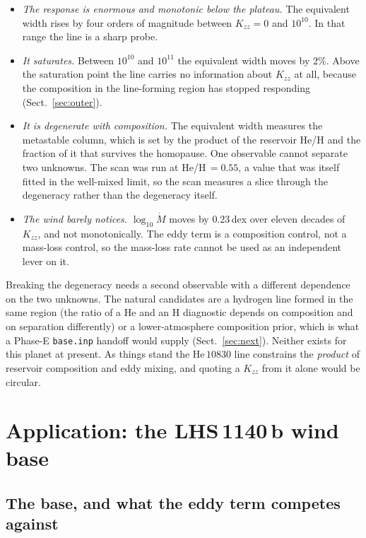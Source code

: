 \documentclass[english,a4paper]{my_memo}
\begin{document}
\begin{itemize}
\item \emph{The response is enormous and monotonic below the plateau.} The
      equivalent width rises by four orders of magnitude between
      $K_{zz} = 0$ and $10^{10}$. In that range the line is a sharp probe.
\item \emph{It saturates.} Between $10^{10}$ and $10^{11}$ the equivalent
      width moves by $2\%$. Above the saturation point the line carries no
      information about $K_{zz}$ at all, because the composition in the
      line-forming region has stopped responding
      (Sect.~\ref{sec:outer}).
\item \emph{It is degenerate with composition.} The equivalent width
      measures the metastable column, which is set by the product of the
      reservoir He/H and the fraction of it that survives the homopause.
      One observable cannot separate two unknowns. The scan was run at
      He/H\,$=0.55$, a value that was itself fitted in the well-mixed limit,
      so the scan measures a slice through the degeneracy rather than the
      degeneracy itself.
\item \emph{The wind barely notices.} $\log_{10}\dot M$ moves by $0.23$\,dex
      over eleven decades of $K_{zz}$, and not monotonically. The eddy term
      is a composition control, not a mass-loss control, so the mass-loss
      rate cannot be used as an independent lever on it.
\end{itemize}

Breaking the degeneracy needs a second observable with a different
dependence on the two unknowns. The natural candidates are a hydrogen line
formed in the same region (the ratio of a He and an H diagnostic depends
on composition and on separation differently) or a lower-atmosphere
composition prior, which is what a Phase-E \texttt{base.inp} handoff would
supply (Sect.~\ref{sec:next}). Neither exists for this planet at present.
As things stand the He\,$10830$ line constrains the \emph{product} of
reservoir composition and eddy mixing, and quoting a $K_{zz}$ from it alone
would be circular.

\section{Application: the LHS\,1140\,b wind base}
\label{sec:base}

\subsection{The base, and what the eddy term competes against}
\end{document}
